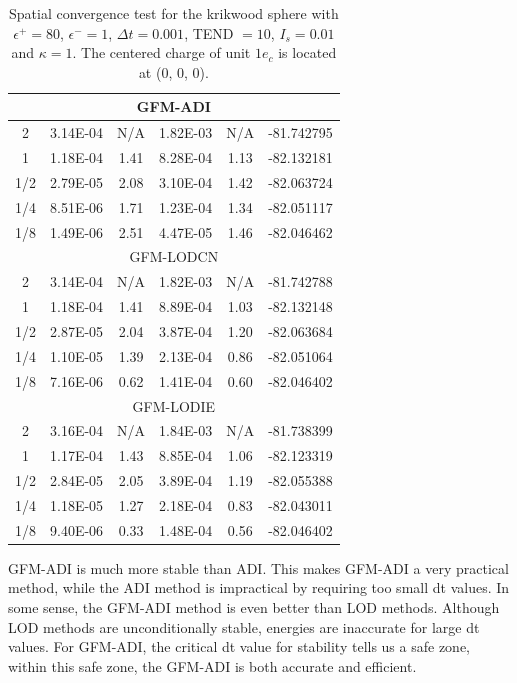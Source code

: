 \begin{table}[!ht]
\begin{tabular}{c c c c c c }
\multicolumn{6}{c}{GFM-ADI} \\ \hline
  2 & 3.14E-04 & N/A & 1.82E-03 & N/A & -81.742795 \\ %
  1 & 1.18E-04 & 1.41 & 8.28E-04 & 1.13 & -82.132181 \\%
1/2 & 2.79E-05 & 2.08 & 3.10E-04 & 1.42 & -82.063724 \\ %
1/4 & 8.51E-06 & 1.71 & 1.23E-04 & 1.34 & -82.051117 \\ %
1/8 & 1.49E-06 & 2.51 & 4.47E-05 & 1.46 & -82.046462 \\ \hline
\multicolumn{6}{c}{GFM-LODCN} \\ \hline
  2 & 3.14E-04 & N/A  & 1.82E-03 & N/A  & -81.742788 \\ %
  1 & 1.18E-04 & 1.41 & 8.89E-04 & 1.03 & -82.132148 \\ %
1/2 & 2.87E-05 & 2.04 & 3.87E-04 & 1.20 & -82.063684 \\ %
1/4 & 1.10E-05 & 1.39 & 2.13E-04 & 0.86 & -82.051064 \\ %
1/8 & 7.16E-06 & 0.62 & 1.41E-04 & 0.60 & -82.046402 \\ \hline
\multicolumn{6}{c}{GFM-LODIE} \\ \hline
2   & 3.16E-04 & N/A   & 1.84E-03 & N/A   & -81.738399 \\ %
1   & 1.17E-04 & 1.43  & 8.85E-04 & 1.06  & -82.123319 \\ %
1/2 & 2.84E-05 & 2.05  & 3.89E-04 & 1.19  & -82.055388 \\ %
1/4 & 1.18E-05 & 1.27  & 2.18E-04 & 0.83  & -82.043011 \\ %
1/8 & 9.40E-06 & 0.33  & 1.48E-04 & 0.56  & -82.046402 \\ \hline
\end{tabular}
\caption{Spatial convergence test for the krikwood sphere with $\epsilon^+=80$, $\epsilon^-=1$, $\Delta t = 0.001$, TEND $=10$, $I_s=0.01$ and $\kappa = 1$. The centered charge of unit $1e_c $ is located at (0, 0, 0).}
\label{tab-krikwood}
\end{table}
GFM-ADI is much more stable than ADI. This makes GFM-ADI a very practical method, while the ADI method is impractical by requiring too small dt values. In some sense, the GFM-ADI method is even better than LOD methods. Although LOD methods are unconditionally stable, energies are inaccurate for large dt values. For GFM-ADI, the critical dt value for stability tells us a safe zone, within this safe zone, the GFM-ADI is both accurate and efficient. 

